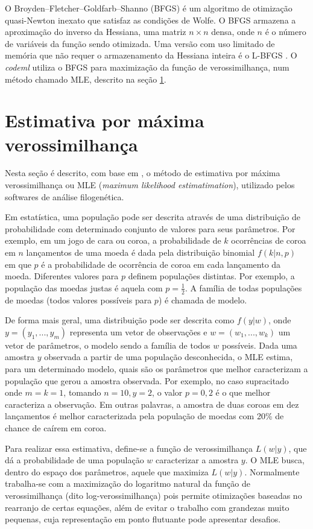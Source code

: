 \documentclass[cic,tc]{iiufrgs}
\begin{document}
O Broyden–Fletcher–Goldfarb–Shanno (BFGS) \cite{fletcher1980practical} é um
algoritmo de otimização quasi-Newton inexato que satisfaz as condições de
Wolfe. O BFGS armazena a aproximação do inverso da Hessiana, uma matriz $n
\times n$ densa, onde $n$ é o número de variáveis da função sendo otimizada.
Uma versão com uso limitado de memória que não requer o armazenamento da
Hessiana inteira é o L-BFGS \cite{liu1989limited}. O \textit{codeml} utiliza o BFGS para
maximização da função de verossimilhança, num método chamado MLE, descrito na
seção \ref{sec:mle}.

\section{Estimativa por máxima verossimilhança}
\label{sec:mle}

Nesta seção é descrito, com base em \cite{myung2003tutorial}, o método de
estimativa por máxima verossimilhança ou MLE (\textit{maximum likelihood
estimatimation}), utilizado pelos softwares de análise filogenética.

Em estatística, uma população pode ser descrita através de uma distribuição de
probabilidade com determinado conjunto de valores para seus parâmetros.
Por exemplo, em um jogo de cara ou coroa, a probabilidade de $k$ ocorrências de
coroa em $n$ lançamentos de uma moeda é dada pela distribuição binomial
$f(k|n,p)$ em que $p$ é a probabilidade de ocorrência de coroa em cada
lançamento da moeda. Diferentes valores para $p$ definem populações distintas.
Por exemplo, a população das moedas justas é aquela com $p = \frac{1}{2}$. A
família de todas populações de moedas (todos valores possíveis para $p$) é
chamada de modelo.

De forma mais geral, uma distribuição pode ser descrita como $f(y|w)$, onde $y
= (y_1, ..., y_m)$ representa um vetor de observações e $w = (w_1, ..., w_k)$
um vetor de parâmetros, o modelo sendo a família de todos $w$ possíveis. Dada
uma amostra $y$ observada a partir de uma população desconhecida, o MLE estima,
para um determinado modelo, quais são os parâmetros que melhor caracterizam a
população que gerou a amostra observada. Por exemplo, no caso supracitado
onde $m = k = 1$, tomando $n = 10, y = 2$, o valor $p = 0{,}2$ é o que melhor
caracteriza a observação. Em outras palavras, a amostra de duas coroas em dez
lançamentos é melhor caracterizada pela população de moedas com 20\% de chance
de caírem em coroa.

Para realizar essa estimativa, define-se a função de verossimilhança $L(w|y)$,
que dá a probabilidade de uma população $w$ caracterizar a amostra $y$. O MLE
busca, dentro do espaço dos parâmetros, aquele que maximiza $L(w|y)$.
Normalmente trabalha-se com a maximização do logaritmo natural da função de
verossimilhança (dito log-verossimilhança) pois permite otimizações baseadas no
rearranjo de certas equações, além de evitar o trabalho com grandezas muito
pequenas, cuja representação em ponto flutuante pode apresentar desafios.
\end{document}
